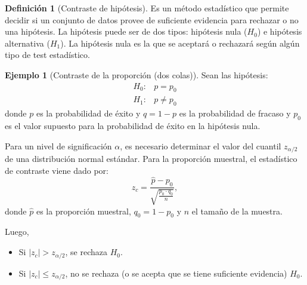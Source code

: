\documentclass[11pt,a4paper]{book}
\theoremstyle{definition}%
\newtheorem{definicion}[teorema]{Definici\'on}
\newtheorem{ejemplo}[teorema]{Ejemplo}
\newcommand{\abs}[1]{\left| #1 \right|}
\begin{document}
            \begin{definicion}[Contraste de hipótesis]
                Es un método estadístico que permite decidir si un conjunto de datos provee de suficiente evidencia para rechazar o no una hipótesis. La hipótesis puede ser de dos tipos: hipótesis nula ($H_0$) e hipótesis alternativa ($H_1$). La hipótesis nula es la que se aceptará o rechazará según algún tipo de test estadístico.
            \end{definicion}
            \begin{ejemplo}[Contraste de la proporción (dos colas)]
               Sean las hipótesis:
                \[
                \begin{split}
                    H_{0}: &p = p_{0}\\
                    H_{1}: &p \neq p_{0}
                \end{split}
                \]
                donde \(p\) es la probabilidad de éxito y \(q = 1-p\) es la probabilidad de fracaso y $p_{0}$ es el valor supuesto para la probabilidad de éxito en la hipótesis nula.

                Para un nivel de significación \(\alpha\), es necesario determinar el valor del cuantil \(z_{\alpha/2}\) de una distribución normal estándar. Para la proporción muestral, el estadístico de contraste viene dado por:
                \[
                z_{c} = \frac{\hat{p} - p_{0}}{\sqrt{\frac{p_{0}\cdot q_{0}}{n}}} ,
                \]
                donde \(\hat{p}\) es la proporción muestral, \(q_{0} = 1-p_{0}\) y \(n\) el tamaño de la muestra.

                Luego, 
                \begin{itemize}
                    \item Si \(\abs{z_{c}} > z_{\alpha/2}\), se rechaza $H_{0}$.
                    \item Si \(\abs{z_{c}} \leq z_{\alpha/2}\), no se rechaza (o se acepta que se tiene suficiente evidencia) $H_{0}$.
                \end{itemize}
            \end{ejemplo}
\end{document}
